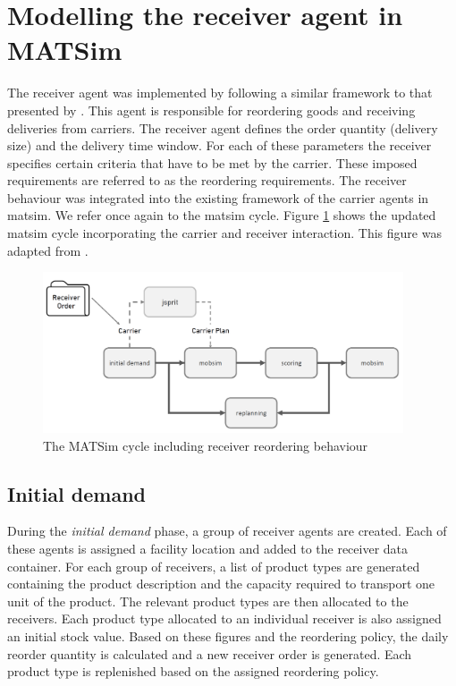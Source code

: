 \section{Modelling the receiver agent in MATSim}
The receiver agent was implemented by following a similar framework to that presented by \citet{schroeder2012towards}. This agent is responsible for reordering goods and receiving deliveries from carriers. The receiver agent defines the order quantity (delivery size) and the delivery time window. For each of these parameters the receiver specifies certain criteria that have to be met by the carrier. These imposed requirements are referred to as the reordering requirements. The receiver behaviour was integrated into the existing framework of the carrier agents in \acrshort{matsim}. We refer once again to the \acrshort{matsim} cycle. Figure \ref{fig:receiver_ext} shows the updated \acrshort{matsim} cycle incorporating the carrier and receiver interaction. This figure was adapted from \citet{bean2020behavioural}.
\par

\begin{figure}[h!]
    \centering
    \includegraphics[width=0.95\textwidth]{images/receiver_extension.PNG}
    \caption{The MATSim cycle including receiver reordering behaviour }
    \label{fig:receiver_ext}
\end{figure}


\subsection{Initial demand}
During the \textit{initial demand} phase, a group of receiver agents are created. Each of these agents is assigned a facility location and added to the receiver data container. For each group of receivers, a list of product types are generated containing the product description and the capacity required to transport one unit of the product. The relevant product types are then allocated to the receivers. Each product type allocated to an individual receiver is also assigned an initial stock value. Based on these figures and the reordering policy, the daily reorder quantity is calculated and a new receiver order is generated. Each product type is replenished based on the assigned reordering policy.

